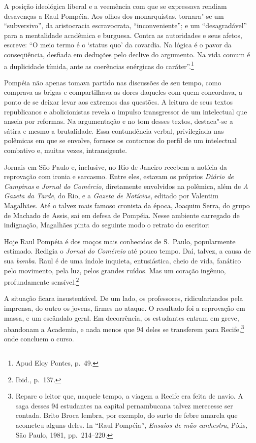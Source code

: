 A posição ideológica liberal e a veemência com que se
expressava rendiam desavenças a Raul Pompéia. Aos olhos dos
monarquistas, tornara"-se um ``subversivo'', da aristocracia
escravocrata, ``inconveniente''; e um ``desagradável'' para a mentalidade
acadêmica e burguesa. Contra as autoridades e seus afetos, escreve: ``O
meio termo é o `status quo' da covardia. Na lógica é o pavor da
conseqüência, desfiada em deduções pelo declive do argumento. Na vida
comum é a duplicidade tímida, ante as coerências enérgicas do
caráter''.\footnote{Apud Eloy Pontes, p.~49.}


Pompéia não apenas tomava partido nas discussões de seu tempo, como
comprava as brigas e compartilhava as dores daqueles com quem
concordava, a ponto de se deixar levar aos extremos das questões. A
leitura de seus textos republicanos e abolicionistas revela o impulso
transgressor de um intelectual que anseia por reformas. Na argumentação
e no tom desses textos, destaca"-se a sátira e mesmo a brutalidade.
Essa contundência verbal, privilegiada nas polêmicas em que se envolve,
fornece os contornos do perfil de um intelectual combativo e, muitas
vezes, intransigente.


Jornais em São Paulo e, inclusive, no Rio de Janeiro
recebem a notícia da reprovação com ironia e sarcasmo. Entre eles,
estavam os próprios \textit{Diário de Campinas} e \textit{Jornal do
Comércio}, diretamente envolvidos na polêmica, além de
\textit{A Gazeta da Tarde}, do Rio, e a
\textit{Gazeta de Notícias}, editado por
Valentim Magalhães. Até o talvez mais famoso cronista da época, Joaquim
Serra, do grupo de Machado de Assis, sai em defesa de Pompéia. Nesse
ambiente carregado de indignação, Magalhães pinta do seguinte modo o
retrato do escritor: 

\begin{hedraquote}
Hoje Raul Pompéia é dos moços mais conhecidos de S.~Paulo, 
popularmente estimado. Redigia o \textit{Jornal do
Comércio} até pouco tempo. Daí, talvez, a causa de sua
\textit{bomba}. Raul é de uma índole
inquieta, entusiástica, cheio de vida, fanático pelo movimento, pela
luz, pelos grandes ruídos. Mas um coração ingênuo, profundamente
sensível.\footnote{Ibid., p.~137.}
\end{hedraquote} 


A situação ficara insustentável. De um lado, os
professores, ridicularizados pela imprensa, do outro os jovens, firmes
no ataque. O resultado foi a reprovação em massa, e um escândalo geral.
Em decorrência, os estudantes entram em greve, abandonam a Academia, e
nada menos que 94 deles se transferem para Recife,\footnote{Repare o
leitor que, naquele tempo, a viagem a Recife era feita de navio. A saga
desses 94 estudantes na capital pernambucana talvez merecesse ser contada. Brito
Broca lembra, por exemplo, do surto de febre amarela que acometeu
alguns deles. In ``Raul Pompéia'', \textit{Ensaios de mão canhestra}, Pólis, 
São Paulo, 1981, pp.~214--220.} onde concluem o curso.



